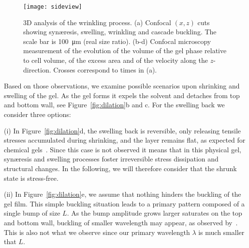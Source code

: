 \documentclass[twocolumn,superscriptaddress,showpacs,preprintnumbers,
amsmath,amssymb,prl]{revtex4-1}
\begin{document}
\begin{figure}
	\texttt{[image: sideview]}
	\caption{3D analysis of the wrinkling process. (a) Confocal $(x,z)$ cuts showing syn\ae{}resis, swelling, wrinkling and cascade buckling. The scale bar is \SI{100}{\micro\metre} (real size ratio). (b-d) Confocal microscopy measurement of the evolution of the volume of the gel phase relative to cell volume, of the excess area and of the velocity along the $z$-direction. Crosses correspond to times in (a).}
	\label{fig:sideview}
\end{figure}

Based on those observations, we examine possible scenarios upon shrinking and swelling of the gel. As the gel forms it expels the solvent and detaches from top and bottom wall, see Figure~\ref{fig:dilation}b and c. For the swelling back we consider three options: 

\noindent
(i) In Figure~\ref{fig:dilation}d, the swelling back is reversible, only releasing tensile stresses accumulated during shrinking, and the layer remains flat, as expected for chemical gels~\cite{Kim2010}. Since this case is not observed it means that in this physical gel, syn\ae{}resis and swelling processes foster irreversible stress dissipation and structural changes. In the following, we will therefore consider that the shrunk state is stress-free. 

\noindent
(ii) In Figure~\ref{fig:dilation}e, we assume that nothing hinders the buckling of the gel film. This simple buckling situation leads to a primary pattern composed of a single bump of size $L$. As the bump amplitude grows larger saturates on the top and bottom wall, buckling of smaller wavelength may appear, as observed by~\cite{Roman1999}. This is also not what we observe since our primary wavelength $\lambda$ is much smaller that $L$.
\end{document}
